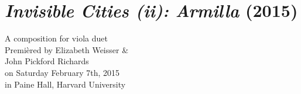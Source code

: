 \chapter{\emph{Invisible Cities (ii): Armilla} (2015)}
\label{chap:armilla}

\begin{singlespacing}
\begin{flushright}
A composition for viola duet \\
\vspace*{\baselineskip}
Premi\`{e}red by Elizabeth Weisser \& \\
John Pickford Richards \\
on Saturday February 7th, 2015 \\
in Paine Hall, Harvard University
\end{flushright}
\end{singlespacing}

